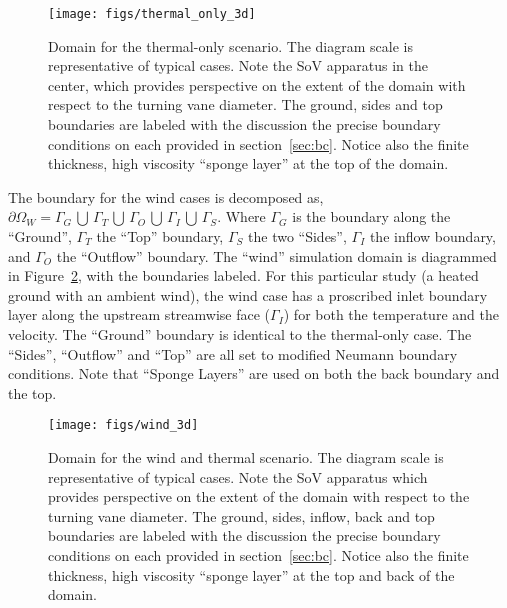 \begin{figure}[!htb]
  \begin{center}
    \texttt{[image: figs/thermal\_only\_3d]}
    \caption{Domain for the thermal-only
   scenario. The diagram scale is representative of typical cases. Note
   the SoV apparatus in the center, which provides perspective on the
   extent of the domain with respect to the turning vane diameter. The
   ground, sides and top boundaries are labeled with the discussion the
   precise boundary conditions on each provided in
   section~\ref{sec:bc}. Notice also the finite thickness, high
   viscosity ``sponge layer'' at the top of the domain.} 
    \label{fig:thermal3d}
  \end{center}
\end{figure}

The boundary for the wind cases is decomposed as,
$\partial \Omega_W = \Gamma_G \, \bigcup \, \Gamma_T \, \bigcup \,
\Gamma_O \, \bigcup \, \Gamma_I \, \bigcup \, \Gamma_S $.  
Where $\Gamma_G$ is the boundary along the ``Ground'',
$\Gamma_T$ the ``Top'' boundary, $\Gamma_S$ the two ``Sides'',
$\Gamma_I$ the inflow boundary, and $\Gamma_O$ the ``Outflow''  
boundary.
The ``wind'' simulation domain is diagrammed in
Figure~\ref{fig:wind3d}, with the boundaries labeled. 
For this particular study (a heated ground with 
an ambient wind), the wind case has a proscribed inlet boundary layer
along the upstream streamwise face ($\Gamma_I$) for both the temperature
and the velocity. The ``Ground'' boundary is identical to
the thermal-only case. The ``Sides'', ``Outflow'' and ``Top'' are all
set to modified Neumann boundary conditions. Note that ``Sponge Layers''
are used on both the back boundary and the top. 

\begin{figure}[!htb]
  \begin{center}
   \texttt{[image: figs/wind\_3d]}
    \caption{Domain for the wind and thermal scenario. The diagram scale
   is representative of typical cases. Note the SoV apparatus which
   provides perspective on the extent of the domain with respect to the
   turning vane diameter. The ground, sides, inflow, back and top
   boundaries are labeled with the discussion the precise boundary
   conditions on each provided in section~\ref{sec:bc}. Notice also the
   finite thickness, high viscosity ``sponge layer'' at the top and back
   of the domain.}   
    \label{fig:wind3d}
  \end{center}
\end{figure}

